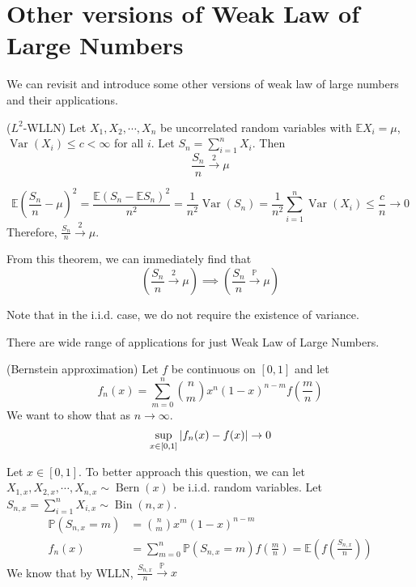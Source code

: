 \documentclass{huhtakm-template-book}
\newcommand{\prob}{\mathbb{P}}
\newcommand{\expect}{\mathbb{E}}
\DeclareMathOperator{\Bern}{Bern}
\DeclareMathOperator{\Bin}{Bin}
\DeclareMathOperator{\Var}{Var}
\begin{document}
\section{Other versions of Weak Law of Large Numbers}
We can revisit and introduce some other versions of weak law of large numbers and their applications.
\begin{thm}($L^{2}$-WLLN) 
	Let $X_{1},X_{2},\cdots,X_{n}$ be uncorrelated random variables with $\expect X_{i}=\mu$, $\Var(X_{i})\leq c<\infty$ for all $i$. Let $S_{n}=\sum_{i=1}^{n}X_{i}$. Then
	\begin{equation*}
		\frac{S_{n}}{n}\xrightarrow{2}\mu
	\end{equation*}
\end{thm}
\begin{proofing}
	\begin{equation*}
		\expect\left(\frac{S_{n}}{n}-\mu\right)^{2}=\frac{\expect(S_{n}-\expect S_{n})^{2}}{n^{2}}=\frac{1}{n^{2}}\Var(S_{n})=\frac{1}{n^{2}}\sum_{i=1}^{n}\Var(X_{i})\leq\frac{c}{n}\to 0
	\end{equation*}
	Therefore, $\frac{S_{n}}{n}\xrightarrow{2}\mu$.
\end{proofing}
\begin{rem}
	From this theorem, we can immediately find that
	\begin{equation*}
		\left(\frac{S_{n}}{n}\xrightarrow{2}\mu\right)\implies\left(\frac{S_{n}}{n}\xrightarrow{\prob}\mu\right)
	\end{equation*}
\end{rem}
\begin{rem}
	Note that in the i.i.d. case, we do not require the existence of variance.
\end{rem}
There are wide range of applications for just Weak Law of Large Numbers.
\begin{eg}(Bernstein approximation)
	Let $f$ be continuous on $[0,1]$ and let
	\begin{equation*}
		\tag{Bernstein polynomial}
		f_{n}(x)=\sum_{m=0}^{n}\binom{n}{m}x^{n}(1-x)^{n-m}f\left(\frac{m}{n}\right)
	\end{equation*}
	We want to show that as $n\to\infty$.
	\begin{equation*}
		\sup_{x\in[0,1]}\left|{f_{n}(x)-f(x)}\right|\to 0
	\end{equation*}
\end{eg}
\begin{rem}
	Let $x\in[0,1]$. To better approach this question, we can let $X_{1,x},X_{2,x},\cdots,X_{n,x}\sim\Bern(x)$ be i.i.d. random variables. Let $S_{n,x}=\sum_{i=1}^{n}X_{i,x}\sim\Bin(n,x)$.
	\begin{align*}
		\prob(S_{n,x}=m)&=\binom{n}{m}x^{m}(1-x)^{n-m}\\
		f_{n}(x)&=\sum_{m=0}^{n}\prob(S_{n,x}=m)f\left(\frac{m}{n}\right)=\expect\left(f\left(\frac{S_{n,x}}{n}\right)\right)
	\end{align*}
	We know that by WLLN, $\frac{S_{n,x}}{n}\xrightarrow{\prob}x$
\end{rem}
\end{document}

